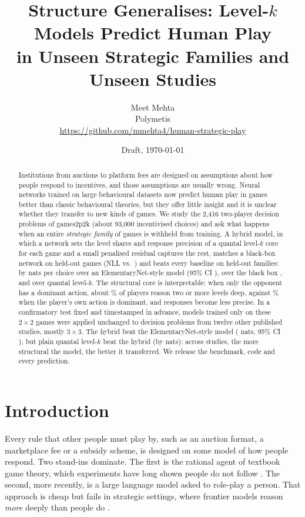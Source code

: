 \documentclass[11pt]{article}
\title{Structure Generalises: Level-$k$ Models Predict Human Play\\in Unseen Strategic Families and Unseen Studies}
\author{Meet Mehta\\ Polymetis\\ \url{https://github.com/mmehta4/human-strategic-play}}
\date{Draft, \today}
\begin{document}
\maketitle

\begin{abstract}
Institutions from auctions to platform fees are designed on assumptions about how people respond
to incentives, and those assumptions are usually wrong. Neural networks trained on large
behavioural datasets now predict human play in games better than classic behavioural theories, but
they offer little insight and it is unclear whether they transfer to new kinds of games. We study
the 2,416 two-player decision problems of games2p2k (about 93,000 incentivised choices) and ask
what happens when an entire \emph{strategic family} of games is withheld from training. A hybrid
model, in which a network sets the level shares and response precision of a quantal level-$k$ core
for each game and a small penalised residual captures the rest, matches a black-box network on
held-out games (NLL \nllGamesHybrid{} vs.\ \nllGamesMLP{}) and beats every baseline on held-out
families: by \diffFamilyElem{} nats per choice over an ElementaryNet-style model (95\% CI
\ciFamilyElem), \diffFamilyMLP{} over the black box \ciFamilyMLP, and \diffFamilyQLk{} over quantal
level-$k$. The structural core is interpretable: when only the opponent has a dominant action,
about \deepOtherDominant\% of players reason two or more levels deep, against \deepSelfDominant\%
when the player's own action is dominant, and responses become less precise. In a confirmatory test fixed
and timestamped in advance, models trained only on these $2\times2$ games were applied unchanged to
\hOneProblems{} decision problems from twelve other published studies, mostly $3\times3$. The hybrid
beat the ElementaryNet-style model (\hOneDiffElem{} nats, 95\% CI \hOneCiElem), but plain quantal
level-$k$ beat the hybrid (by \hOneDiffQLk{} nats): across studies, the more structural the model,
the better it transferred. We release the benchmark, code and every prediction.
\end{abstract}

\section{Introduction}

Every rule that other people must play by, such as an auction format, a marketplace fee or a
subsidy scheme, is designed on some model of how people respond. Two stand-ins dominate. The first
is the rational agent of textbook game theory, which experiments have long shown people do not
follow \citep{nagel1995unraveling,camerer2004cognitive,crawford2013structural}. The second, more
recently, is a large language model asked to role-play a person. That approach is cheap but fails
in strategic settings, where frontier models reason \emph{more} deeply than people do
\citep{wang2026discovering}.
\end{document}
